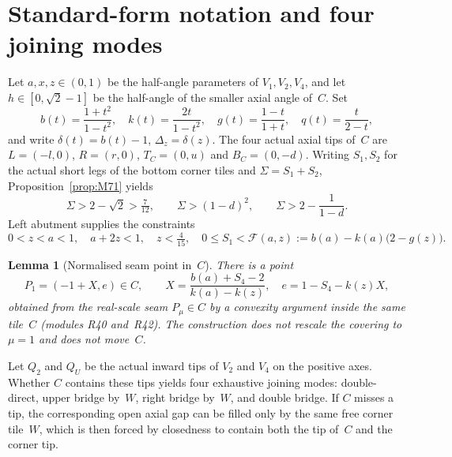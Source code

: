 \documentclass[11pt,reqno]{amsart}
\newtheorem{lemma}[theorem]{Lemma}
\theoremstyle{definition}
\begin{document}
\section{Standard-form notation and four joining modes}\label{sec:std}

Let $a,x,z\in(0,1)$ be the half-angle parameters of $V_1,V_2,V_4$, and let
$h\in[0,\sqrt2-1]$ be the half-angle of the smaller axial angle of~$C$.  Set
\begin{equation}\label{eq:M8}
b(t)=\frac{1+t^2}{1-t^2},\quad
k(t)=\frac{2t}{1-t^2},\quad
g(t)=\frac{1-t}{1+t},\quad
q(t)=\frac{t}{2-t},
\end{equation}
and write $\delta(t)=b(t)-1$, $\Delta_z=\delta(z)$.  The four actual axial tips
of~$C$ are $L=(-l,0)$, $R=(r,0)$, $T_C=(0,u)$ and $B_C=(0,-d)$.  Writing
$S_1,S_2$ for the actual short legs of the bottom corner tiles and
$\Sigma=S_1+S_2$, Proposition~\ref{prop:M71} yields
\begin{equation}\label{eq:M9}
\Sigma>2-\sqrt2>\tfrac7{12},\qquad
\Sigma>(1-d)^2,\qquad
\Sigma>2-\frac1{1-d}.
\end{equation}
Left abutment supplies the constraints
\begin{equation}\label{eq:M10}
0<z<a<1,\quad a+2z<1,\quad z<\tfrac4{15},\quad
0\le S_1<\mathcal F(a,z):=b(a)-k(a)\bigl(2-g(z)\bigr).
\end{equation}

\begin{lemma}[Normalised seam point in~$C$]\label{lem:M81}
There is a point
\begin{equation}\label{eq:M11}
P_1=(-1+X,e)\in C,\qquad
X=\frac{b(a)+S_4-2}{k(a)-k(z)},\quad
e=1-S_4-k(z)X,
\end{equation}
obtained from the real-scale seam $P_\mu\in C$ by a convexity argument inside
the same tile~$C$ (modules R40 and~R42).  The construction does not rescale the
covering to $\mu=1$ and does not move~$C$.
\end{lemma}

Let $Q_2$ and $Q_U$ be the actual inward tips of $V_2$ and $V_4$ on the positive
axes.  Whether $C$ contains these tips yields four exhaustive joining modes:
double-direct, upper bridge by~$W$, right bridge by~$W$, and double bridge.
If $C$ misses a tip, the corresponding open axial gap can be filled only by the
same free corner tile~$W$, which is then forced by closedness to contain both
the tip of~$C$ and the corner tip.
\end{document}
